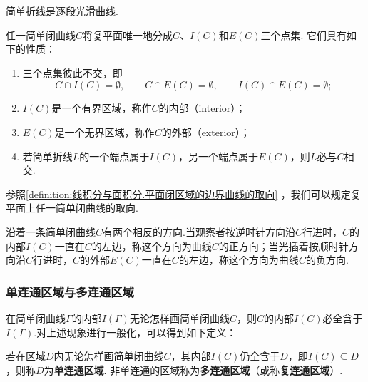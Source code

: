 \begin{example}
简单折线是逐段光滑曲线.
\end{example}

\begin{theorem}[若尔当定理]
任一简单闭曲线\(C\)将复平面唯一地分成\(C\)、\(I(C)\)和\(E(C)\)三个点集.
它们具有如下的性质：\begin{enumerate}
\item 三个点集彼此不交，即\[
C \cap I(C) = \emptyset,
\qquad
C \cap E(C) = \emptyset,
\qquad
I(C) \cap E(C) = \emptyset;
\]
\item \(I(C)\)是一个有界区域，称作\(C\)的内部（interior）；
\item \(E(C)\)是一个无界区域，称作\(C\)的外部（exterior）；
\item 若简单折线\(L\)的一个端点属于\(I(C)\)，另一个端点属于\(E(C)\)，则\(L\)必与\(C\)相交.
\end{enumerate}
\end{theorem}

参照\cref{definition:线积分与面积分.平面闭区域的边界曲线的取向} ，我们可以规定复平面上任一简单闭曲线的取向.
\begin{definition}
沿着一条简单闭曲线\(C\)有两个相反的方向.当观察者按逆时针方向沿\(C\)行进时，\(C\)的内部\(I(C)\)一直在\(C\)的左边，称这个方向为曲线\(C\)的正方向；当光插着按顺时针方向沿\(C\)行进时，\(C\)的外部\(E(C)\)一直在\(C\)的左边，称这个方向为曲线\(C\)的负方向.
\end{definition}

\subsubsection{单连通区域与多连通区域}
在简单闭曲线\(\Gamma\)的内部\(I(\Gamma)\)无论怎样画简单闭曲线\(C\)，则\(C\)的内部\(I(C)\)必全含于\(I(\Gamma)\).对上述现象进行一般化，可以得到如下定义：
\begin{definition}
若在区域\(D\)内无论怎样画简单闭曲线\(C\)，其内部\(I(C)\)仍全含于\(D\)，即\(I(C) \subseteq D\)，则称\(D\)为\textbf{单连通区域}.
非单连通的区域称为\textbf{多连通区域}（或称\textbf{复连通区域}）.
\end{definition}

